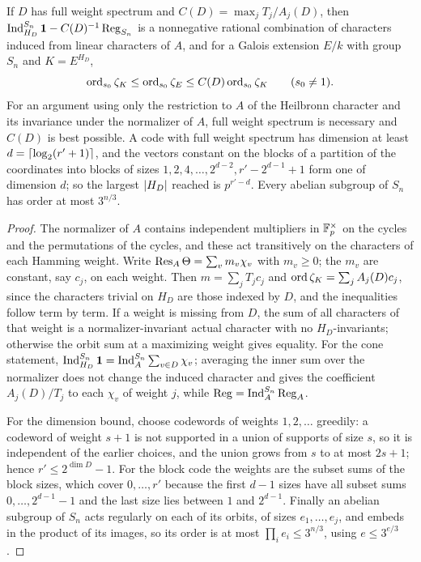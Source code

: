 \begin{proposition}\label{nab:prop:codes}
If $D$ has full weight spectrum and $C(D)=\max_jT_j/A_j(D)$, then
$\operatorname{Ind}_{H_D}^{S_n}\mathbf{1}-C(D)^{-1}\operatorname{Reg}_{S_n}$ is a nonnegative rational combination of
characters induced from linear characters of $A$, and for a Galois extension $E/k$ with group
$S_n$ and $K=E^{H_D}$,
\[
 \operatorname{ord}_{s_0}\zeta_K\le\operatorname{ord}_{s_0}\zeta_E\le C(D)\operatorname{ord}_{s_0}\zeta_K\qquad(s_0\ne1).
\]
For an argument using only the restriction to $A$ of the Heilbronn character and its
invariance under the normalizer of $A$, full weight spectrum is necessary and $C(D)$ is best
possible. A code with full weight spectrum has dimension at least $d=\lceil\log_2(r'+1)\rceil$,
and the vectors constant on the blocks of a partition of the coordinates into blocks of
sizes $1,2,4,\dots,2^{d-2},r'-2^{d-1}+1$ form one of dimension $d$; so the largest
$\lvert H_D\rvert$ reached is $p^{r'-d}$. Every abelian subgroup of $S_n$ has order at most $3^{n/3}$.
\end{proposition}
\begin{proof}
The normalizer of $A$ contains independent multipliers in $\mathbb{F}_p^\times$ on the cycles and the
permutations of the cycles, and these act transitively on the characters of each Hamming
weight. Write $\operatorname{Res}_A\Theta=\sum_vm_v\chi_v$ with $m_v\ge0$; the $m_v$ are constant, say $c_j$, on
each weight. Then $m=\sum_jT_jc_j$ and $\operatorname{ord}\zeta_K=\sum_jA_j(D)c_j$, since the characters
trivial on $H_D$ are those indexed by $D$, and the inequalities follow term by term. If a weight
is missing from $D$, the sum of all characters of that weight is a normalizer-invariant
actual character with no $H_D$-invariants; otherwise the orbit sum at a maximizing weight
gives equality. For the cone statement, $\operatorname{Ind}_{H_D}^{S_n}\mathbf{1}=\operatorname{Ind}_A^{S_n}\sum_{v\in D}\chi_v$;
averaging the inner sum over the normalizer does not change the induced character and gives
the coefficient $A_j(D)/T_j$ to each $\chi_v$ of weight $j$, while $\operatorname{Reg}=\operatorname{Ind}_A^{S_n}\operatorname{Reg}_A$.

For the dimension bound, choose codewords of weights $1,2,\dots$ greedily: a codeword of
weight $s+1$ is not supported in a union of supports of size $s$, so it is independent of
the earlier choices, and the union grows from $s$ to at most $2s+1$; hence $r'\le2^{\dim D}-1$.
For the block code the weights are the subset sums of the block sizes, which cover
$0,\dots,r'$ because the first $d-1$ sizes have all subset sums $0,\dots,2^{d-1}-1$ and the
last size lies between $1$ and $2^{d-1}$. Finally an abelian subgroup of $S_n$ acts regularly on
each of its orbits, of sizes $e_1,\dots,e_j$, and embeds in the product of its images, so its
order is at most $\prod_ie_i\le3^{n/3}$, using $e\le3^{e/3}$.
\end{proof}

